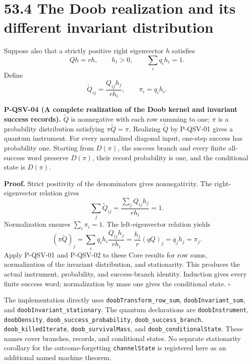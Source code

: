 \documentclass[
  11pt,
  oneside]{book}
\begin{document}
\section{53.4 The Doob realization and its different invariant
distribution}

Suppose also that a strictly positive right eigenvector \(h\) satisfies
\[
Qh=rh,\qquad h_i>0,\qquad \sum_iq_ih_i=1.
\] Define \[
\widetilde Q_{ij}=\frac{Q_{ij}h_j}{rh_i},\qquad \pi_i=q_ih_i.
\]

\label{p-qsv-04}{}

\textbf{P-QSV-04 (A complete realization of the Doob kernel and
invariant success records).} \(\widetilde Q\) is nonnegative with each
row summing to one; \(\pi\) is a probability distribution satisfying
\(\pi\widetilde Q=\pi\). Realizing \(\widetilde Q\) by P-QSV-01 gives a
quantum instrument. For every normalized diagonal input, one-step
success has probability one. Starting from \(D(\pi)\), the success
branch and every finite all-success word preserve \(D(\pi)\), their
record probability is one, and the conditional state is \(D(\pi)\).

\textbf{Proof.} Strict positivity of the denominators gives
nonnegativity. The right-eigenvector relation gives \[
\sum_j\widetilde Q_{ij}=\frac{\sum_jQ_{ij}h_j}{rh_i}=1.
\] Normalization ensures \(\sum_i\pi_i=1\). The left-eigenvector
relation yields \[
(\pi\widetilde Q)_j
=\sum_iq_ih_i\frac{Q_{ij}h_j}{rh_i}
=\frac{h_j}{r}(qQ)_j=q_jh_j=\pi_j.
\] Apply P-QSV-01 and P-QSV-02 to these Core results for row sums,
normalization of the invariant distribution, and stationarity. This
produces the actual instrument, probability, and success-branch
identity. Induction gives every finite success word; normalization by
mass one gives the conditional state. \(\square\)

The implementation directly uses \texttt{doob\allowbreak Transform\_\allowbreak row\_\allowbreak sum},
\texttt{doob\allowbreak Invariant\_\allowbreak sum}, and \texttt{doob\allowbreak Invariant\_\allowbreak stationary}. The
quantum declarations are \texttt{doob\allowbreak Instrument}, \texttt{doob\allowbreak Density},
\texttt{doob\_\allowbreak success\_\allowbreak probability}, \texttt{doob\_\allowbreak success\_\allowbreak branch},
\texttt{doob\_\allowbreak killed\allowbreak Iterate}, \texttt{doob\_\allowbreak survival\allowbreak Mass}, and
\texttt{doob\_\allowbreak conditional\allowbreak State}. These names cover branches, records,
and conditional states. No separate stationarity corollary for the
outcome-forgetting \texttt{channel\allowbreak State} is registered here as an
additional named machine theorem.
\end{document}
